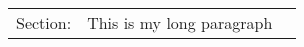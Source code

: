 \documentclass{article}
\begin{document}
\begin{tabularx}{\textwidth}{l|c|r}
    Section:   &  This is my     \newline
                  long paragraph \\
\end{tabularx}
\end{document}
